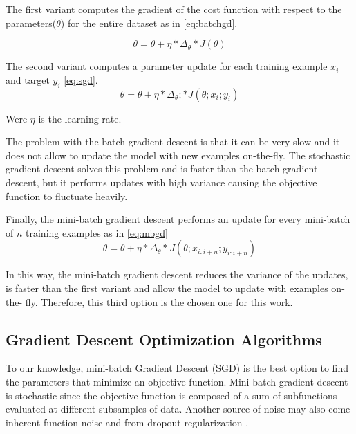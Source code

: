The first variant computes the gradient of the cost function with respect to the parameters($\theta$) for the entire dataset as in \ref{eq:batchgd}.

\begin{equation} \label{eq:batchgd}
\theta=\theta+\eta * \Delta_\theta * J(\theta)
\end{equation}

The second variant computes a parameter update for each training example $x_i$ and target $y_i$ \ref{eq:sgd}.
\begin{equation} \label{eq:sgd}
\theta=\theta+\eta * \Delta_\theta; * J(\theta;x_i;y_i)
\end{equation}

Were $\eta$ is the learning rate.

The problem with the batch gradient descent is that it can be very slow and it does not allow to update the model with new examples on-the-fly. The stochastic gradient descent solves this problem and is faster than the batch gradient descent, but it performs updates with high variance causing the objective function to fluctuate heavily.  

Finally, the mini-batch gradient descent performs an update for every mini-batch of $n$ training examples as in \ref{eq:mbgd} \begin{equation} \label{eq:mbgd}
\theta=\theta+\eta * \Delta_\theta * J(\theta;x_{i:i+n};y_{i:i+n})
\end{equation}

In this way, the mini-batch gradient descent reduces the variance of the updates, is faster than the first variant and allow the model to update with examples on-the- fly. Therefore, this third option is the chosen one for this work\cite{ruder2016overview}. 


\subsection{Gradient Descent Optimization Algorithms}
To our knowledge, mini-batch Gradient Descent (SGD) is the best option to find the parameters that minimize an objective function. Mini-batch gradient descent is stochastic since the objective function is composed of a sum of subfunctions evaluated at different subsamples of data. Another source of noise may also come inherent function noise and from dropout regularization \cite{kingma2014adam}. 

